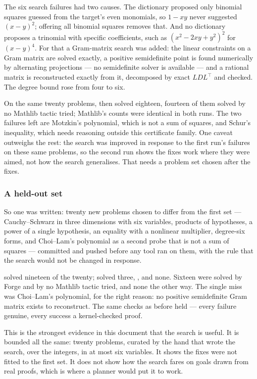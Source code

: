 The six search failures had two causes. The dictionary proposed only binomial
squares guessed from the target's even monomials, so $1 - xy$ never suggested
$(x-y)^2$; offering all binomial squares removes that. And no dictionary proposes
a trinomial with specific coefficients, such as $(x^2 - 2xy + y^2)^2$ for
$(x-y)^4$. For that a Gram-matrix search was added: the linear constraints on a
Gram matrix are solved exactly, a positive semidefinite point is found
numerically by alternating projections --- no semidefinite solver is available
--- and a rational matrix is reconstructed exactly from it, decomposed by exact
$LDL^\top$ and checked. The degree bound rose from four to six.

On the same twenty problems,  then solved eighteen, fourteen of
them solved by no Mathlib tactic tried; Mathlib's counts were identical in both
runs. The two failures left are Motzkin's polynomial, which is not a sum of
squares, and Schur's inequality, which needs reasoning outside this certificate
family. One caveat outweighs the rest: the search was improved in response to the
first run's failures on these same problems, so the second run shows the fixes
work where they were aimed, not how the search generalises. That needs a problem
set chosen after the fixes.

\subsubsection*{A held-out set}

So one was written: twenty new problems chosen to differ from the first set ---
Cauchy--Schwarz in three dimensions with six variables, products of hypotheses,
a power of a single hypothesis, an equality with a nonlinear multiplier,
degree-six forms, and Choi--Lam's polynomial as a second probe that is not a sum
of squares --- committed and pushed before any tool ran on them, with the rule
that the search would not be changed in response.

 solved nineteen of the twenty;  solved three,
,  and  none. Sixteen were solved by
Forge and by no Mathlib tactic tried, and none the other way. The single miss was
Choi--Lam's polynomial, for the right reason: no positive semidefinite Gram
matrix exists to reconstruct. The same checks as before held --- every
 failure genuine, every success a kernel-checked proof.

This is the strongest evidence in this document that the search is useful. It is
bounded all the same: twenty problems, curated by the hand that wrote the search,
over the integers, in at most six variables. It shows the fixes were not fitted
to the first set. It does not show how the search fares on goals drawn from real
proofs, which is where a planner would put it to work.

